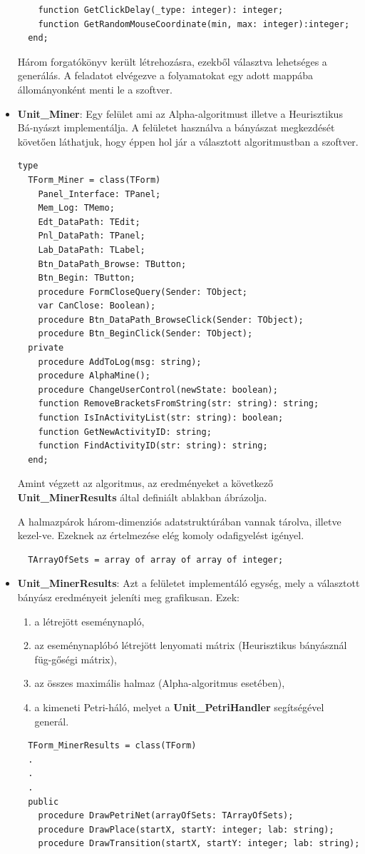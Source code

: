 \begin{itemize}
{\begin{lstlisting}
    function GetClickDelay(_type: integer): integer;
    function GetRandomMouseCoordinate(min, max: integer):integer;
  end;

	\end{lstlisting}

		Három forgatókönyv került létrehozásra, ezekből választva lehetséges a generálás. A feladatot elvégezve a folyamatokat egy adott mappába állományonként menti le a szoftver.
	}
	\item{
		\textbf{Unit\_Miner}: Egy felület ami az Alpha-algoritmust illetve a Heurisztikus Bá\hyp{}nyászt  implementálja. A felületet használva a bányászat megkezdését követően láthatjuk, hogy éppen hol jár a választott algoritmustban a szoftver.
	\begin{lstlisting}
type
  TForm_Miner = class(TForm)
    Panel_Interface: TPanel;
    Mem_Log: TMemo;
    Edt_DataPath: TEdit;
    Pnl_DataPath: TPanel;
    Lab_DataPath: TLabel;
    Btn_DataPath_Browse: TButton;
    Btn_Begin: TButton;
    procedure FormCloseQuery(Sender: TObject;
    var CanClose: Boolean);
    procedure Btn_DataPath_BrowseClick(Sender: TObject);
    procedure Btn_BeginClick(Sender: TObject);
  private
    procedure AddToLog(msg: string);
    procedure AlphaMine();
    procedure ChangeUserControl(newState: boolean);
    function RemoveBracketsFromString(str: string): string;
    function IsInActivityList(str: string): boolean;
    function GetNewActivityID: string;
    function FindActivityID(str: string): string;
  end;
	\end{lstlisting}

Amint végzett az algoritmus, az eredményeket a következő \textbf{Unit\_MinerResults} által definiált ablakban ábrázolja.

A halmazpárok három-dimenziós adatstruktúrában vannak tárolva, illetve kezel\hyp{}ve. Ezeknek az értelmezése elég komoly odafigyelést igényel.
	\begin{lstlisting}
  TArrayOfSets = array of array of array of integer;
	\end{lstlisting}

	}
	\item{
		\textbf{Unit\_MinerResults}: Azt a felületet implementáló egység, mely a választott bányász eredményeit jeleníti meg grafikusan. Ezek:
		\begin{enumerate}
			\item{a létrejött eseménynapló,}
			\item{az eseménynaplóbó létrejött lenyomati mátrix (Heurisztikus bányásznál füg\hyp{}gőségi mátrix),}
			\item{az összes maximális halmaz (Alpha-algoritmus esetében),}
			\item{a kimeneti Petri-háló, melyet a \textbf{Unit\_PetriHandler} segítségével generál.}
		\end{enumerate}
		\begin{lstlisting}
  TForm_MinerResults = class(TForm)
  .
  .
  .
  public
    procedure DrawPetriNet(arrayOfSets: TArrayOfSets);
    procedure DrawPlace(startX, startY: integer; lab: string);
    procedure DrawTransition(startX, startY: integer; lab: string);


\end{lstlisting}}
\end{itemize}
